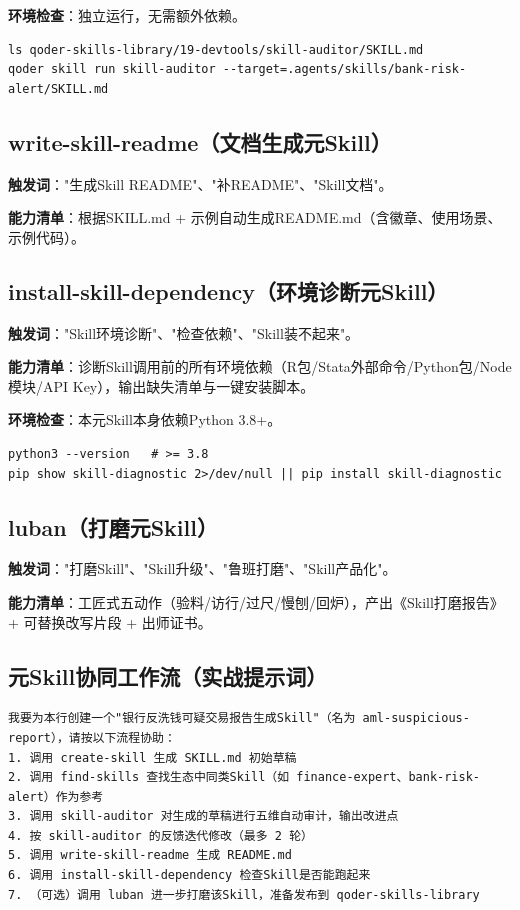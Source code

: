 \textbf{环境检查}：独立运行，无需额外依赖。
\begin{lstlisting}[style=shell]
ls qoder-skills-library/19-devtools/skill-auditor/SKILL.md
qoder skill run skill-auditor --target=.agents/skills/bank-risk-alert/SKILL.md
\end{lstlisting}

\subsection{write-skill-readme（文档生成元Skill）}
\textbf{触发词}："生成Skill README"、"补README"、"Skill文档"。

\textbf{能力清单}：根据SKILL.md + 示例自动生成README.md（含徽章、使用场景、示例代码）。

\subsection{install-skill-dependency（环境诊断元Skill）}
\textbf{触发词}："Skill环境诊断"、"检查依赖"、"Skill装不起来"。

\textbf{能力清单}：诊断Skill调用前的所有环境依赖（R包/Stata外部命令/Python包/Node模块/API Key），输出缺失清单与一键安装脚本。

\textbf{环境检查}：本元Skill本身依赖Python 3.8+。
\begin{lstlisting}[style=shell]
python3 --version   # >= 3.8
pip show skill-diagnostic 2>/dev/null || pip install skill-diagnostic
\end{lstlisting}

\subsection{luban（打磨元Skill）}
\textbf{触发词}："打磨Skill"、"Skill升级"、"鲁班打磨"、"Skill产品化"。

\textbf{能力清单}：工匠式五动作（验料/访行/过尺/慢刨/回炉），产出《Skill打磨报告》 + 可替换改写片段 + 出师证书。

\subsection{元Skill协同工作流（实战提示词）}

\begin{lstlisting}
我要为本行创建一个"银行反洗钱可疑交易报告生成Skill"（名为 aml-suspicious-report），请按以下流程协助：
1. 调用 create-skill 生成 SKILL.md 初始草稿
2. 调用 find-skills 查找生态中同类Skill（如 finance-expert、bank-risk-alert）作为参考
3. 调用 skill-auditor 对生成的草稿进行五维自动审计，输出改进点
4. 按 skill-auditor 的反馈迭代修改（最多 2 轮）
5. 调用 write-skill-readme 生成 README.md
6. 调用 install-skill-dependency 检查Skill是否能跑起来
7. （可选）调用 luban 进一步打磨该Skill，准备发布到 qoder-skills-library
\end{lstlisting}

